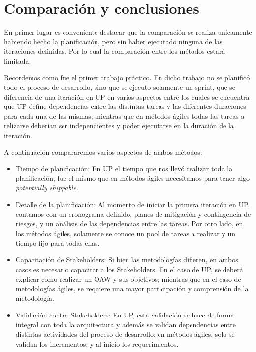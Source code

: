 \section{Comparaci\'on y conclusiones}

En primer lugar es conveniente destacar que la comparaci\'on se realiza unicamente habiendo hecho la planificaci\'on, pero sin haber ejecutado ninguna de las iteraciones definidas. Por lo cual la comparaci\'on entre los m\'etodos estar\'a limitada.

Recordemos como fue el primer trabajo pr\'actico. En dicho trabajo no se planific\'o todo el proceso de desarrollo, sino que se ejecuto solamente un sprint, que se diferencia de una iteraci\'on en UP en varios aspectos entre los cuales se encuentra que UP define dependencias entre las distintas tareas y las diferentes duraciones para cada una de las mismas; mientras que en m\'etodos \'agiles todas las tareas a relizarse deber\'ian ser independientes y poder ejecutarse en la duraci\'on de la iteraci\'on.


A continuaci\'on compararemos varios aspectos de ambos m\'etodos:

\begin{itemize}
\item Tiempo de planificaci\'on: En UP el tiempo que nos llev\'o realizar toda la planificaci\'on, fue el mismo que en m\'etodos \'agiles necesitamos para tener algo \emph{potentially shippable}.
\item Detalle de la planificaci\'on: Al momento de iniciar la primera iteraci\'on en UP, contamos con un cronograma definido, planes de mitigaci\'on y contingencia de riesgos, y un an\'alisis de las dependencias entre las tareas. Por otro lado, en los m\'etodos \'agiles, solamente se conoce un pool de tareas a realizar y un tiempo fijo para todas ellas.
\item Capacitaci\'on de Stakeholders: Si bien las metodolog\'ias difieren, en ambos casos es necesario capacitar a los Stakeholders. En el caso de UP, se deber\'a explicar como realizar un QAW y sus objetivos; mientras que en el caso de metodolog\'ias \'agiles, se requiere una mayor participaci\'on y comprensi\'on de la metodolog\'ia. 
\item Validaci\'on contra Stakeholders: En UP, esta validaci\'on se hace de forma integral con toda la arquitectura y adem\'as se validan dependencias entre distintas actividades del proceso de desarrollo; en m\'etodos \'agiles, solo se validan los incrementos, y al inicio los requerimientos.
\end{itemize}


